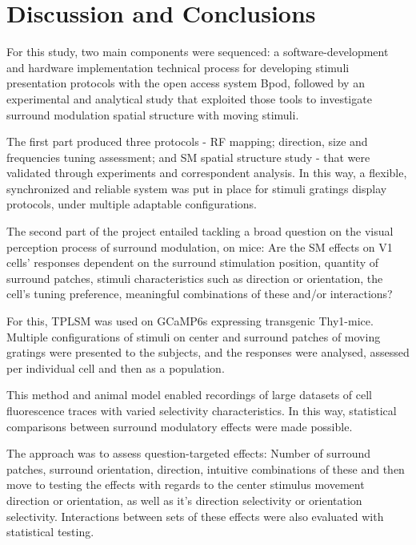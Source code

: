 \chapter{Discussion and Conclusions}
\label{cap:conclusions}

For this study, two main components were sequenced: a software-development and hardware implementation technical process for developing stimuli presentation protocols with the open access system Bpod, followed by an experimental and analytical study that exploited those tools to investigate surround modulation spatial structure with moving stimuli.

The first part produced three protocols - RF mapping; direction, size and frequencies tuning assessment; and SM spatial structure study - that were validated through experiments and correspondent analysis. In this way, a flexible, synchronized and reliable system was put in place for stimuli gratings display protocols, under multiple adaptable configurations.

The second part of the project entailed tackling a broad question on the visual perception process of surround modulation, on mice: Are the SM effects on V1 cells' responses dependent on the surround stimulation position, quantity of surround patches, stimuli characteristics such as direction or orientation, the cell's tuning preference, meaningful combinations of these and/or interactions?

For this, TPLSM was used on GCaMP6s expressing transgenic Thy1-mice. Multiple configurations of stimuli on center and surround patches of moving gratings were presented to the subjects, and the responses were analysed, assessed per individual cell and then as a population.

This method and animal model enabled recordings of large datasets of cell fluorescence traces with varied selectivity characteristics. In this way, statistical comparisons between surround modulatory effects were made possible.

The approach was to assess question-targeted effects: Number of surround patches, surround orientation, direction, intuitive combinations of these and then move to testing the effects with regards to the center stimulus movement direction or orientation, as well as it's direction selectivity or orientation selectivity. Interactions between sets of these effects were also evaluated with statistical testing.

